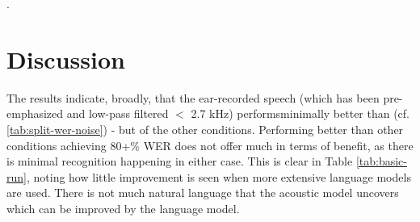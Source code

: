 
\DIFaddend .  




\section{Discussion}
\DIFaddbegin \label{chap4:discussion}
\DIFaddend 

The results indicate, broadly, that the ear-recorded speech (\DIFdelbegin {}\DIFdelend which has been pre-emphasized and low-pass filtered $<$ 2.7 kHz) performs\DIFaddbegin {}\DIFaddend minimally better than \DIFdelbegin {}\DIFdelend \DIFaddbegin {}\DIFaddend (cf. \DIFdelbegin {}\DIFdelend \DIFaddbegin {}\DIFaddend \ref{tab:split-wer-noise}) - but \DIFdelbegin {}\DIFdelend \DIFaddbegin {}\DIFaddend of the other conditions.  Performing better than other conditions achieving 80+\% WER does not offer much in terms of benefit, as there is minimal recognition happening in either case.  This is clear in Table \ref{tab:basic-run}, noting how little improvement is seen when more extensive language models are used.  There is not much natural language that the acoustic model uncovers which can be improved by the language model.

